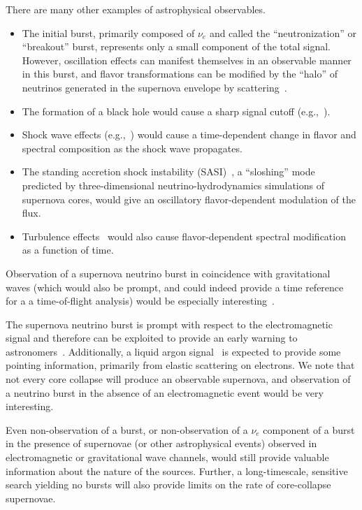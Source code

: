 There are many other examples of astrophysical observables.
\begin{itemize}
\item The initial burst, primarily composed of $\nu_e$ and called the
  ``neutronization'' or ``breakout''
  burst, 
  represents only a small component of the total signal.  However,
  oscillation effects can manifest themselves in an observable manner
  in this burst, and flavor transformations can be modified by the
  ``halo'' of neutrinos generated in the supernova envelope by
  scattering~\cite{Cherry:2013mv}.
\item The formation of a black hole would cause a sharp signal cutoff
  (e.g.,~\cite{Beacom:2000qy,Fischer:2008rh}).
\item Shock wave effects (e.g.,~\cite{Schirato:2002tg}) would cause a
  time-dependent change in flavor and spectral composition as the
  shock wave propagates.
\item The standing accretion shock instability
  (SASI)~\cite{Hanke:2011jf,Hanke:2013ena}, a ``sloshing'' mode
  predicted by three-dimensional neutrino-hydrodynamics simulations of
  supernova cores, would give an oscillatory flavor-dependent
  modulation of the flux.
\item Turbulence effects~\cite{Friedland:2006ta,Lund:2013uta} would
  also cause flavor-dependent spectral modification as a function of
  time.
\end{itemize}

Observation of a supernova neutrino burst in coincidence with gravitational waves (which would also be prompt, and could indeed provide a time reference for a a time-of-flight analysis) would be especially interesting~\cite{Arnaud:2003zr,Ott:2012jq, Mueller:2012sv, Nishizawa:2014zna}.

The supernova neutrino burst is prompt with respect to the
electromagnetic signal and therefore can be exploited to provide an
early warning to astronomers~\cite{Antonioli:2004zb,Scholberg:2008fa}.  
Additionally, a liquid argon signal~\cite{Bueno:2003ei} is expected to
provide some pointing information, primarily from elastic scattering
on electrons.
We note that not every core collapse will produce an observable supernova, and observation of a neutrino burst in the absence of an electromagnetic event would be very interesting. 

Even non-observation of a burst, or non-observation of
a $\nu_e$ component of a burst in the presence of supernovae (or other
astrophysical events) observed in electromagnetic or gravitational
wave channels, would still provide valuable information about the
nature of the sources.  Further, a long-timescale, sensitive search
yielding no bursts will also provide limits on the rate of
core-collapse supernovae.

